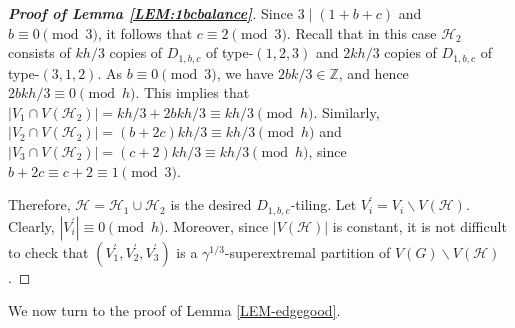 \documentclass[11pt,a4paper,reqno]{amsart}
\theoremstyle{definition} %
\begin{document}
\begin{proof}[\textbf{Proof of Lemma \ref{LEM:1bcbalance}}]
Since $3\mid(1+b+c)$ and $b\equiv0\pmod{3}$, it follows that $c\equiv2\pmod3$. Recall that in this case $\mathcal{H}_2$ consists of $kh/3$ copies of $D_{1,b,c}$ of type-$(1,2,3)$ and $2kh/3$ copies of $D_{1,b,c}$ of type-$(3,1,2)$. As $b\equiv0\pmod{3}$, we have $2bk/3\in\mathbb{Z}$, and hence $2bkh/3\equiv0\pmod h$. This implies that $
|V_1\cap V(\mathcal{H}_2)|=kh/3+2bkh/3\equiv kh/3\pmod h$. 
Similarly, $|V_2\cap V(\mathcal{H}_2)|=(b+2c)kh/3\equiv kh/3\pmod{h}$ 
and $|V_3\cap V(\mathcal{H}_2)|=(c+2)kh/3\equiv kh/3\pmod{h}$, 
since $b+2c\equiv c+2\equiv1\pmod3$. 

Therefore, $\mathcal{H}=\mathcal{H}_1\cup\mathcal{H}_2$ is the desired $D_{1,b,c}$-tiling. Let $V_i^\prime=V_i\backslash V(\mathcal{H})$. Clearly, $|V_i^\prime|\equiv0 \pmod h$. Moreover, since $|V(\mathcal{H})|$ is constant, it is not difficult to check that $(V_1^\prime,V_2^\prime,V_3^\prime)$ is a $\gamma^{1/3}$-superextremal partition of $V(G)\backslash V(\mathcal{H})$.
\end{proof}

We now turn to the proof of Lemma \ref{LEM-edgegood}.
\end{document}
